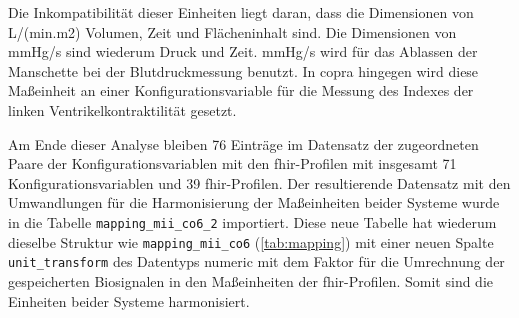 Die Inkompatibilität dieser Einheiten liegt daran, dass die Dimensionen von L/(min.m2) Volumen, Zeit und Flächeninhalt sind. Die Dimensionen von mmHg/s sind wiederum Druck und Zeit.  mmHg/s wird für das Ablassen der Manschette bei der Blutdruckmessung benutzt. In \ac{copra} hingegen wird diese Maßeinheit an einer Konfigurationsvariable für die Messung des Indexes der linken Ventrikelkontraktilität gesetzt.

Am Ende dieser Analyse bleiben 76 Einträge im Datensatz der zugeordneten Paare der Konfigurationsvariablen mit den \ac{fhir}-Profilen mit insgesamt 71 Konfigurationsvariablen und 39 \ac{fhir}-Profilen. Der resultierende Datensatz mit den Umwandlungen für die Harmonisierung der Maßeinheiten beider Systeme wurde in die Tabelle \texttt{mapping\_mii\_co6\_2} importiert. Diese neue Tabelle hat wiederum dieselbe Struktur wie \texttt{mapping\_mii\_co6} (\ref{tab:mapping}) mit einer neuen Spalte \texttt{unit\_transform} des Datentyps \glqq numeric\grqq{} mit dem Faktor für die Umrechnung der gespeicherten Biosignalen in den Maßeinheiten der \ac{fhir}-Profilen. Somit sind die Einheiten beider Systeme harmonisiert.
